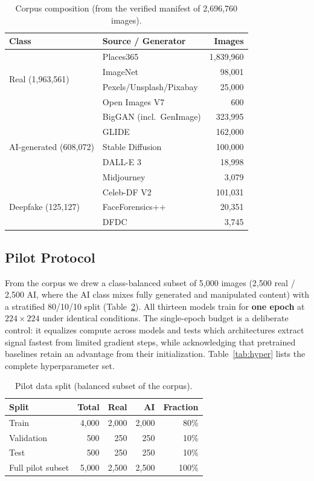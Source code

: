 \documentclass[journal]{IEEEtran}
\begin{document}
\begin{table}[!t]
\renewcommand{\arraystretch}{1.2}
\caption{Corpus composition (from the verified manifest of 2{,}696{,}760 images).}
\label{tab:corpus}
\centering
\setlength{\tabcolsep}{4pt}
\begin{tabular}{llr}
\toprule
Class & Source / Generator & Images \\
\midrule
\multirow{4}{*}{Real (1{,}963{,}561)}
 & Places365            & 1{,}839{,}960 \\
 & ImageNet             & 98{,}001 \\
 & Pexels/Unsplash/Pixabay & 25{,}000 \\
 & Open Images V7       & 600 \\
\midrule
\multirow{5}{*}{AI-generated (608{,}072)}
 & BigGAN (incl.\ GenImage) & 323{,}995 \\
 & GLIDE                & 162{,}000 \\
 & Stable Diffusion     & 100{,}000 \\
 & DALL-E 3             & 18{,}998 \\
 & Midjourney           & 3{,}079 \\
\midrule
\multirow{3}{*}{Deepfake (125{,}127)}
 & Celeb-DF V2          & 101{,}031 \\
 & FaceForensics++      & 20{,}351 \\
 & DFDC                 & 3{,}745 \\
\bottomrule
\end{tabular}
\end{table}

\subsection{Pilot Protocol}
\label{sec:pilot}
From the corpus we drew a class-balanced subset of 5{,}000 images (2{,}500 real / 2{,}500 AI, where the AI class mixes fully generated and manipulated content) with a stratified 80/10/10 split (Table~\ref{tab:split}). All thirteen models train for \textbf{one epoch} at $224\times224$ under identical conditions. The single-epoch budget is a deliberate control: it equalizes compute across models and tests which architectures extract signal fastest from limited gradient steps, while acknowledging that pretrained baselines retain an advantage from their initialization. Table~\ref{tab:hyper} lists the complete hyperparameter set.

\begin{table}[!t]
\renewcommand{\arraystretch}{1.2}
\caption{Pilot data split (balanced subset of the corpus).}
\label{tab:split}
\centering
\begin{tabular}{lrrrr}
\toprule
Split & Total & Real & AI & Fraction \\
\midrule
Train      & 4{,}000 & 2{,}000 & 2{,}000 & 80\% \\
Validation & 500     & 250     & 250     & 10\% \\
Test       & 500     & 250     & 250     & 10\% \\
\midrule
Full pilot subset & 5{,}000 & 2{,}500 & 2{,}500 & 100\% \\
\bottomrule
\end{tabular}
\end{table}
\end{document}
